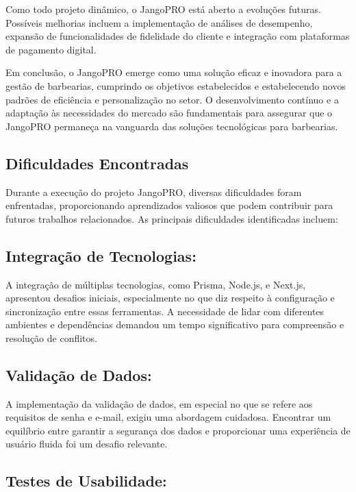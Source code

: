 \documentclass[12pt]{article}
\begin{document}
Como todo projeto dinâmico, o JangoPRO está aberto a evoluções futuras. Possíveis melhorias incluem a implementação de análises de desempenho, expansão de funcionalidades de fidelidade do cliente e integração com plataformas de pagamento digital.

Em conclusão, o JangoPRO emerge como uma solução eficaz e inovadora para a gestão de barbearias, cumprindo os objetivos estabelecidos e estabelecendo novos padrões de eficiência e personalização no setor. O desenvolvimento contínuo e a adaptação às necessidades do mercado são fundamentais para assegurar que o JangoPRO permaneça na vanguarda das soluções tecnológicas para barbearias.


\subsection{Dificuldades Encontradas}

Durante a execução do projeto JangoPRO, diversas dificuldades foram enfrentadas, proporcionando aprendizados valiosos que podem contribuir para futuros trabalhos relacionados. As principais dificuldades identificadas incluem:

\subsection{Integração de Tecnologias:}

A integração de múltiplas tecnologias, como Prisma, Node.js, e Next.js, apresentou desafios iniciais, especialmente no que diz respeito à configuração e sincronização entre essas ferramentas. A necessidade de lidar com diferentes ambientes e dependências demandou um tempo significativo para compreensão e resolução de conflitos.

\subsection{Validação de Dados:}

A implementação da validação de dados, em especial no que se refere aos requisitos de senha e e-mail, exigiu uma abordagem cuidadosa. Encontrar um equilíbrio entre garantir a segurança dos dados e proporcionar uma experiência de usuário fluida foi um desafio relevante.

\subsection{Testes de Usabilidade:}
\end{document}
